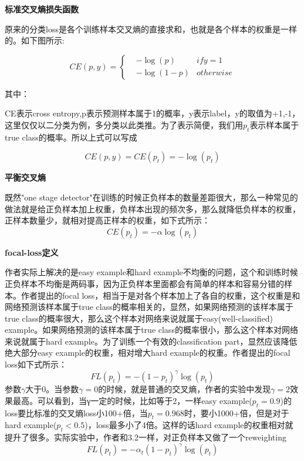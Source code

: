 \textbf{标准交叉熵损失函数}

原来的分类loss是各个训练样本交叉熵的直接求和，也就是各个样本的权重是一样的。如下图所示:

\begin{equation}
CE(p,y)=\left\{
\begin{aligned}
& -\log (p) 	&if y = 1\\
& -\log (1-p) 	&otherwise
\end{aligned}
\right.
\end{equation}

其中：

CE表示cross entropy,p表示预测样本属于1的概率，y表示label，y的取值为{+1,-1}，这里仅仅以二分类为例，多分类以此类推。为了表示简便，我们用$p_t$表示样本属于true class的概率。所以上式可以写成

\[
	CE(p,y) = CE(p_t) = -\log (p_t)
\]

\textbf{平衡交叉熵}

既然"one stage detector"在训练的时候正负样本的数量差距很大，那么一种常见的做法就是给正负样本加上权重，负样本出现的频次多，那么就降低负样本的权重，正样本数量少，就相对提高正样本的权重，如下式所示：
\[
	CE(p_t) = -\alpha \log (p_t)
\]

\textbf{focal-loss定义}

作者实际上解决的是easy example和hard example不均衡的问题，这个和训练时候正负样本不均衡是两码事，因为正负样本里面都会有简单的样本和容易分错的样本。作者提出的focal loss，相当于是对各个样本加上了各自的权重，这个权重是和网络预测该样本属于true class的概率相关的，显然，如果网络预测的该样本属于true class的概率很大，那么这个样本对网络来说就属于easy(well-classified) example。如果网络预测的该样本属于true class的概率很小，那么这个样本对网络来说就属于hard example。为了训练一个有效的classification part，显然应该降低绝大部分easy example的权重，相对增大hard example的权重。作者提出的focal loss如下式所示： 
\[
	FL(p_t) = -(1 - p_t)^\gamma \log (p_t)
\]
参数$\gamma$大于0。当参数$\gamma = 0$的时候，就是普通的交叉熵，作者的实验中发现$\gamma = 2$效果最高。可以看到，当γ一定的时候，比如等于2，一样easy example($p_t = 0.9$)的loss要比标准的交叉熵loss小100+倍，当$p_t=0.968$时，要小1000+倍，但是对于hard example($p_t < 0.5$)，loss最多小了4倍。这样的话hard example的权重相对就提升了很多。实际实验中，作者和3.2一样，对正负样本又做了一个reweighting 
\[
	FL(p_t) = -\alpha _t(1 - p_t)^\gamma \log (p_t)
\]
